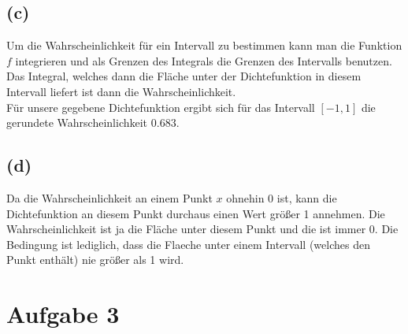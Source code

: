 \documentclass[a4paper]{scrartcl}
\begin{document}
\subsection*{(c)}
Um die Wahrscheinlichkeit für ein Intervall zu bestimmen kann man die Funktion $f$ integrieren und als Grenzen des Integrals die Grenzen des Intervalls benutzen. Das Integral, welches dann die Fläche unter der Dichtefunktion in diesem Intervall liefert ist dann die Wahrscheinlichkeit.\\
Für unsere gegebene Dichtefunktion ergibt sich für das Intervall $\left[-1,1\right]$ die gerundete Wahrscheinlichkeit $0.683$.


\subsection*{(d)}
Da die Wahrscheinlichkeit an einem Punkt $x$ ohnehin 0 ist, kann die Dichtefunktion an diesem Punkt durchaus einen Wert größer 1 annehmen. Die Wahrscheinlichkeit ist ja die Fläche unter diesem Punkt und die ist immer 0. Die Bedingung ist lediglich, dass die Flaeche unter einem Intervall (welches den Punkt enthält) nie größer als 1 wird.


\section*{Aufgabe 3}
\end{document}
